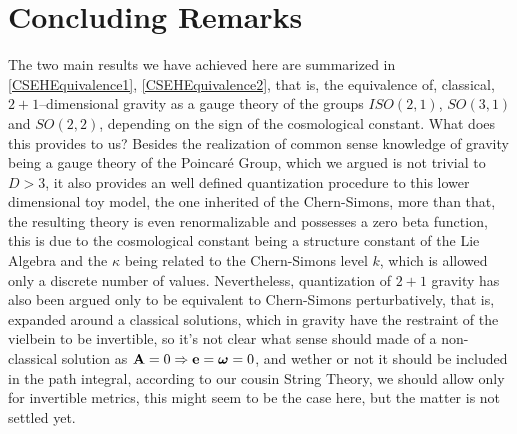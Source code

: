 \section{Concluding Remarks}

The two main results we have achieved here are summarized in \ref{CSEHEquivalence1}, \ref{CSEHEquivalence2}, that is, 
the equivalence of, classical, $2+1$--dimensional gravity as a gauge theory of the groups $ISO(2,1)$, $SO(3,1)$ and $SO(2,2)$, 
depending on the sign of the cosmological constant. What does this provides to us? Besides the realization 
of common sense knowledge of gravity being a gauge theory of the Poincaré Group, which we argued is not trivial to $D>3$, it also 
provides an well defined quantization procedure to this lower dimensional toy model, the one inherited of the Chern-Simons, more than 
that, the resulting theory is even renormalizable and possesses a zero beta function, this is due to the cosmological constant being a 
structure constant of the Lie Algebra and the $\kappa$ being related to the Chern-Simons level $k$, which is allowed only a 
discrete number of values. Nevertheless, quantization of $2+1$ gravity has also been argued only 
to be equivalent to Chern-Simons perturbatively, that is, expanded around a classical solutions, which in gravity 
have the restraint of the vielbein to be invertible, so it's not clear what sense should made of a non-classical solution as $\vb A=0\Rightarrow\vb e=\boldsymbol\omega=0$, 
and wether or not it should be included in the path integral, according to our cousin String Theory, we should allow only for invertible metrics, 
this might seem to be the case here, but the matter is not settled yet.